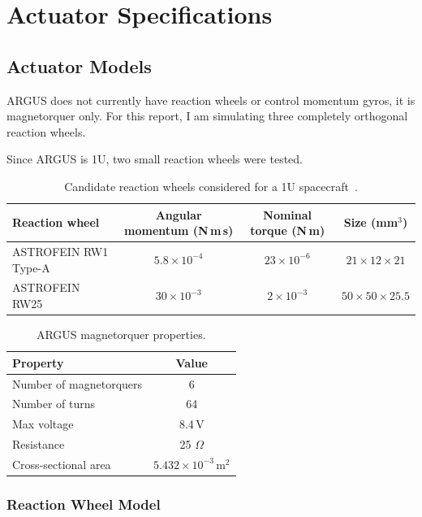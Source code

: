 \documentclass[conference,onecolumn,draftclsnofoot]{IEEEtran}
\begin{document}
\clearpage
\section{Actuator Specifications}

\subsection{Actuator Models}
ARGUS does not currently have reaction wheels or control momentum gyros, it is magnetorquer only. For this report, I am simulating three completely orthogonal reaction wheels.

Since ARGUS is 1U, two small reaction wheels were tested.

\begin{table}[H]
  \centering
  \caption{Candidate reaction wheels considered for a 1U spacecraft~\cite{astrofeinRW1,astrofeinRW25}.}
  \label{tab:reaction-wheel-candidates}
  \begin{tabular}{|l|c|c|c|}
    \hline
    \textbf{Reaction wheel} & \textbf{Angular momentum (N\,m\,s)} & \textbf{Nominal torque (N\,m)} & \textbf{Size (mm$^3$)} \\
    \hline
    ASTROFEIN RW1 Type-A & $5.8\times 10^{-4}$ & $23\times 10^{-6}$ & $21\times 12\times 21$ \\
    \hline
    ASTROFEIN RW25 & $30\times 10^{-3}$ & $2\times 10^{-3}$ & $50\times 50\times 25.5$ \\
    \hline
  \end{tabular}
\end{table}

\begin{table}[H]
  \centering
  \caption{ARGUS magnetorquer properties.}
  \label{tab:argus-magnetorquers}
  \begin{tabular}{|l|c|}
    \hline
    \textbf{Property} & \textbf{Value} \\
    \hline
    Number of magnetorquers & 6 \\
    \hline
    Number of turns & 64 \\
    \hline
    Max voltage & 8.4\,V \\
    \hline
    Resistance & 25\,\,$\Omega$ \\
    \hline
    Cross-sectional area & $5.432\times 10^{-3}$\,m$^2$ \\
    \hline
  \end{tabular}
\end{table}

\subsubsection{Reaction Wheel Model}
\end{document}
